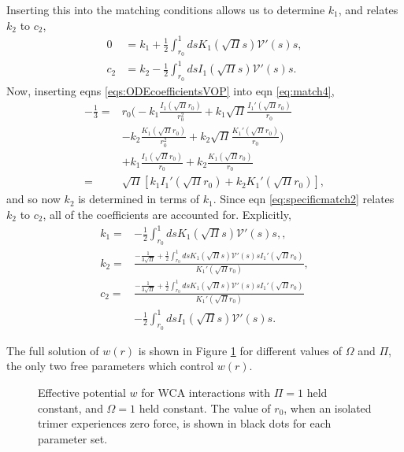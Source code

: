 \documentclass[twocolumn,amsmath,amssymb,aps]{revtex4-1}%
\begin{document}
Inserting this into the matching conditions allows us to determine $k_1$, and
relates $k_2$ to $c_2$,
\begin{subequations}
  \label{eqs:specificmatching}
  \begin{align}
    0 &= k_1 + \frac{1}{2}\int_{r_0}^1dsK_1(\sqrt{\Pi}s)
        \mathcal{V}'(s)s,\label{eq:specificmatch1}\\
    c_2  &= k_2 - \frac{1}{2}\int_{r_0}^1dsI_1(\sqrt{\Pi}s)
           \mathcal{V}'(s)s\label{eq:specificmatch2}.
  \end{align}
\end{subequations}
Now, inserting eqns \ref{eqs:ODEcoefficientsVOP} into eqn \ref{eq:match4},
\begin{align}
  -\frac{1}{3}=
  &r_0\bigg(-k_1\frac{I_1(\sqrt{\Pi}r_0)}{r_0^2}+k_1\sqrt{\Pi}
    \frac{I_1'(\sqrt{\Pi}r_0)}{r_0}\nonumber\\
  &-k_2\frac{K_1(\sqrt{\Pi}r_0)}{r_0^2}+k_2\sqrt{\Pi}
    \frac{K_1'(\sqrt{\Pi}r_0)}{r_0}\bigg)\nonumber\\
  & +k_1\frac{I_1(\sqrt{\Pi}r_0)}{r_0} + k_2\frac{K_1(\sqrt{\Pi}r_0)}{r_0}
    \nonumber\\
  =&\sqrt{\Pi}[k_1I_1'(\sqrt{\Pi}r_0)+k_2K_1'(\sqrt{\Pi}r_0)],
\end{align}
and so now $k_2$ is determined in terms of $k_1$. Since eqn
\ref{eq:specificmatch2} relates $k_2$ to $c_2$, all of the coefficients are
accounted for. Explicitly,
\begin{align}
  k_1 =& -\frac{1}{2}\int_{r_0}^1dsK_1(\sqrt{\Pi}s)
         \mathcal{V}'(s)s,\label{eq:k1},\\
  k_2 =& \frac{-\frac{1}{3\sqrt{\Pi}}+\frac{1}{2}\int_{r_0}^1ds
         K_1(\sqrt{\Pi}s)\mathcal{V}'(s)sI_1'(\sqrt{\Pi}r_0)}
         {K_1'(\sqrt{\Pi}r_0)}\label{eq:k2},\\
  c_2 =& \frac{-\frac{1}{3\sqrt{\Pi}}+\frac{1}{2}\int_{r_0}^1ds
         K_1(\sqrt{\Pi}s)\mathcal{V}'(s)sI_1'(\sqrt{\Pi}r_0)}
         {K_1'(\sqrt{\Pi}r_0)}\nonumber\\
       &-\frac{1}{2}\int_{r_0}^1dsI_1(\sqrt{\Pi}s)
         \mathcal{V}'(s)s\label{eq:c2}.
\end{align}

The full solution of $w(r)$ is shown in Figure \ref{fig:3} for different
values of $\Omega$ and $\Pi$, the only two free parameters which control
$w(r)$.

\begin{figure}[!t]
  \subfloat{\label{fig:3b}}
  \caption{Effective potential $w$ for WCA interactions with
    \protect{} $\Pi=1$ held constant, and
    \protect{} $\Omega=1$ held constant. The value of $r_0$,
    when an isolated trimer experiences zero force, is shown in black dots
    for each parameter set.
  }\label{fig:3}
\end{figure}
\end{document}
